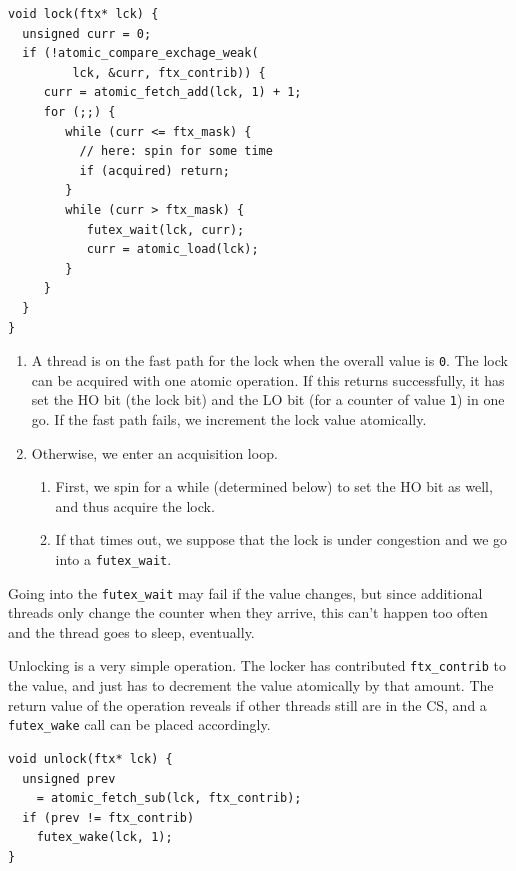 \lstset{language=C11,label= ,caption= ,numbers=none}
\begin{lstlisting}
void lock(ftx* lck) {
  unsigned curr = 0;
  if (!atomic_compare_exchage_weak(
         lck, &curr, ftx_contrib)) {
     curr = atomic_fetch_add(lck, 1) + 1;
     for (;;) {
        while (curr <= ftx_mask) {
          // here: spin for some time
          if (acquired) return;
        }
        while (curr > ftx_mask) {
           futex_wait(lck, curr);
           curr = atomic_load(lck);
        }
     }
  }
}
\end{lstlisting}

\begin{enumerate}
\item A thread is on the fast path for the lock when the overall value
is \texttt{0}. The lock can be acquired with one atomic operation.  If
this returns successfully, it has set the HO bit (the lock bit)
and the LO bit (for a counter of value \texttt{1}) in one go. If the
fast path fails, we increment the lock value atomically.

\item Otherwise, we enter an acquisition loop.\itemadjust

\begin{enumerate}
\item First, we spin for a while (determined below) to set the HO
bit as well, and thus acquire the lock.

\item If that times out, we suppose that the lock is under
congestion and we go into a \texttt{futex\_wait}.\itemadjust
\end{enumerate}
\end{enumerate}

Going into the \texttt{futex\_wait} may fail if the value changes, but
since additional threads only change the counter when they arrive,
this can't happen too often and the thread goes to sleep,
eventually.

Unlocking is a very simple operation. The locker has contributed
\texttt{ftx\_contrib} to the value, and just has to decrement the value
atomically by that amount.  The return value of the operation
reveals if other threads still are in the CS, and a
\texttt{futex\_wake} call can be placed accordingly.

\lstset{language=C11,label= ,caption= ,numbers=none}
\begin{lstlisting}
void unlock(ftx* lck) {
  unsigned prev
    = atomic_fetch_sub(lck, ftx_contrib);
  if (prev != ftx_contrib)
    futex_wake(lck, 1);
}
\end{lstlisting}


